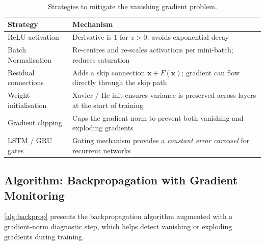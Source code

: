 \documentclass[12pt,a4paper]{article}
\begin{document}
\begin{table}[htbp]
  \centering
  \caption{Strategies to mitigate the vanishing gradient problem.}
  \label{tab:vg_mitigations}
  \begin{tabularx}{\linewidth}{lX}
    \toprule
    \textbf{Strategy} & \textbf{Mechanism} \\
    \midrule
    ReLU activation      & Derivative is $1$ for $z > 0$; avoids
                           exponential decay \\
    Batch Normalisation  & Re-centres and re-scales activations per
                           mini-batch; reduces saturation \\
    Residual connections & Adds a skip connection $\mathbf{x} +
                           F(\mathbf{x})$; gradient can flow directly
                           through the skip path \\
    Weight initialisation & Xavier / He init ensures variance is
                            preserved across layers at the start of
                            training \\
    Gradient clipping    & Caps the gradient norm to prevent both
                           vanishing and exploding gradients \\
    LSTM / GRU gates     & Gating mechanism provides a \emph{constant
                           error carousel} for recurrent networks \\
    \bottomrule
  \end{tabularx}
\end{table}

\subsection{Algorithm: Backpropagation with Gradient Monitoring}
\label{ssec:backprop_algo}

\cref{alg:backprop} presents the backpropagation algorithm augmented
with a gradient-norm diagnostic step, which helps detect vanishing or
exploding gradients during training.
\end{document}
